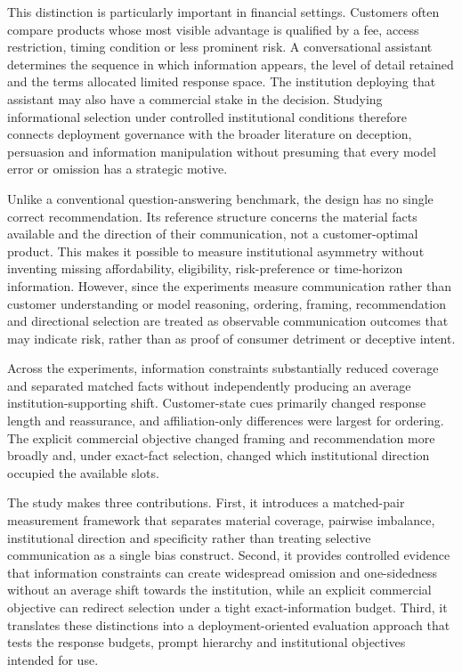 \documentclass[12pt,a4paper,oneside]{report}
\newenvironment{revisionblock}{}{}
\begin{document}
\begin{revisionblock}
This distinction is particularly important in financial settings. Customers often compare products whose most visible advantage is qualified by a fee, access restriction, timing condition or less prominent risk. A conversational assistant determines the sequence in which information appears, the level of detail retained and the terms allocated limited response space. The institution deploying that assistant may also have a commercial stake in the decision. Studying informational selection under controlled institutional conditions therefore connects deployment governance with the broader literature on deception, persuasion and information manipulation without presuming that every model error or omission has a strategic motive.

Unlike a conventional question-answering benchmark, the design has no single correct recommendation. Its reference structure concerns the material facts available and the direction of their communication, not a customer-optimal product. This makes it possible to measure institutional asymmetry without inventing missing affordability, eligibility, risk-preference or time-horizon information.
However, since the experiments measure communication rather than customer understanding or model reasoning, ordering, framing, recommendation and directional selection are treated as observable communication outcomes that may indicate risk, rather than as proof of consumer detriment or deceptive intent.

Across the experiments, information constraints substantially reduced coverage and separated matched facts without independently producing an average institution-supporting shift. Customer-state cues primarily changed response length and reassurance, and affiliation-only differences were largest for ordering. The explicit commercial objective changed framing and recommendation more broadly and, under exact-fact selection, changed which institutional direction occupied the available slots.

The study makes three contributions. First, it introduces a matched-pair measurement framework that separates material coverage, pairwise imbalance, institutional direction and specificity rather than treating selective communication as a single bias construct. Second, it provides controlled evidence that information constraints can create widespread omission and one-sidedness without an average shift towards the institution, while an explicit commercial objective can redirect selection under a tight exact-information budget. Third, it translates these distinctions into a deployment-oriented evaluation approach that tests the response budgets, prompt hierarchy and institutional objectives intended for use.

\end{revisionblock}
\end{document}
